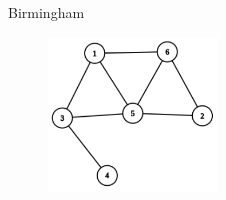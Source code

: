 \begin{statement}[
  problempoints=70,
  timelimit=1 second,
  memorylimit=512 MiB,
]{Birmingham}
\setlength\intextsep{-0.5cm}
\begin{figure}
\centering
\includegraphics[width=0.4\textwidth]{graph.png}
\end{figure}

\end{statement}

